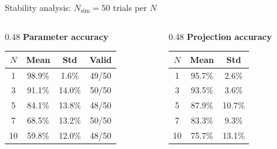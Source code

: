 \documentclass{beamer}
\begin{document}
    \begin{frame}{Stability analysis: $N_{\mathrm{sim}} = 50$ trials per $N$}
        \begin{columns}[T]
            \begin{column}{0.48\textwidth}
                \centering
                \textbf{Parameter accuracy}

                \vspace{0.3em}
                \small
                \begin{tabular}{@{}cccc@{}}
                    \toprule
                    $N$ & Mean & Std & Valid \\
                    \midrule
                    1  & 98.9\% & 1.6\% & 49/50 \\
                    3  & 91.1\% & 14.0\% & 50/50 \\
                    5  & 84.1\% & 13.8\% & 48/50 \\
                    7  & 68.5\% & 13.2\% & 50/50 \\
                    10 & 59.8\% & 12.0\% & 48/50 \\
                    \bottomrule
                \end{tabular}
                \normalsize
            \end{column}
            \begin{column}{0.48\textwidth}
                \centering
                \textbf{Projection accuracy}

                \vspace{0.3em}
                \small
                \begin{tabular}{@{}ccc@{}}
                    \toprule
                    $N$ & Mean & Std \\
                    \midrule
                    1  & 95.7\% & 2.6\% \\
                    3  & 93.5\% & 3.6\% \\
                    5  & 87.9\% & 10.7\% \\
                    7  & 83.3\% & 9.3\% \\
                    10 & 75.7\% & 13.1\% \\
                    \bottomrule
                \end{tabular}
                \normalsize
            \end{column}
        \end{columns}


\end{frame}
\end{document}
